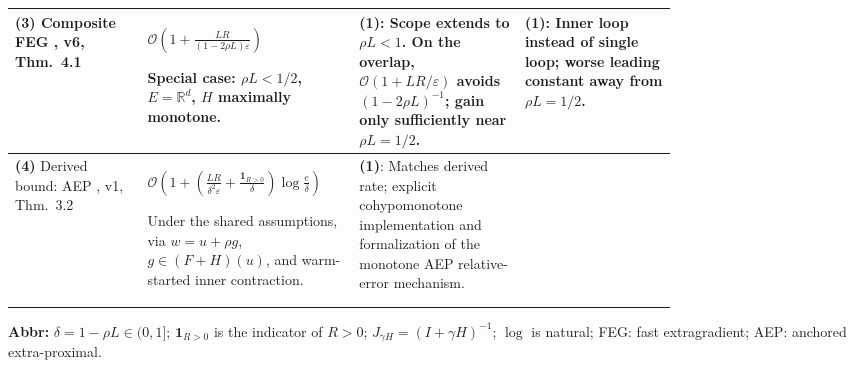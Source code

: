 \begin{table}[tp]
\begin{threeparttable}
\begin{tabularx}{\linewidth}{@{}>{\raggedright\arraybackslash}p{0.20\linewidth}>{\raggedright\arraybackslash}p{0.32\linewidth}>{\raggedright\arraybackslash}p{0.25\linewidth}>{\raggedright\arraybackslash}X@{}}
\midrule
\textbf{(3)} Composite FEG \citep{cohypCOZ2024v6}, v6, Thm.~4.1
& $\mathcal{O}\!\left(1+\frac{LR}{(1-2\rho L)\varepsilon}\right)$\par
Special case: $\rho L<1/2$, $E=\mathbb{R}^d$, $H$ maximally monotone.
& \textbf{(1)}: Scope extends to $\rho L<1$. On the overlap, $\mathcal{O}(1+LR/\varepsilon)$ avoids $(1-2\rho L)^{-1}$; gain only sufficiently near $\rho L=1/2$.
& \textbf{(1)}: Inner loop instead of single loop; worse leading constant away from $\rho L=1/2$. \\
\midrule
\textbf{(4)} Derived bound: AEP \citep{cohypJY2026v1}, v1, Thm.~3.2
& $\mathcal{O}\!\left(1+\left(\frac{LR}{\delta^2\varepsilon}+\frac{\mathbf{1}_{R>0}}{\delta}\right)\log\frac{e}{\delta}\right)$\par
Under the shared assumptions, via $w=u+\rho g$, $g\in(F+H)(u)$, and warm-started inner contraction.
& \textbf{(1)}: Matches derived rate; explicit cohypomonotone implementation and formalization of the monotone AEP relative-error mechanism. & \\
\bottomrule
\end{tabularx}
\begin{tablenotes}[flushleft]\footnotesize
\item[] \textbf{Abbr:} $\delta=1-\rho L\in(0,1]$; $\mathbf{1}_{R>0}$ is the indicator of $R>0$; $J_{\gamma H}=(I+\gamma H)^{-1}$; $\log$ is natural; FEG: fast extragradient; AEP: anchored extra-proximal.
\end{tablenotes}
\end{threeparttable}
\end{table}
\clearpage
